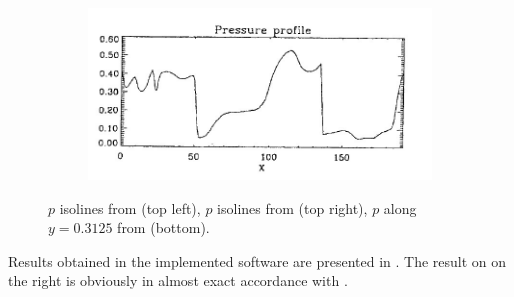 \begin{figure}[H]
\\
\begin{subfigure}[b]{0.75\textwidth}\includegraphics[width=\textwidth]{img/ot/ref-zachary-pressure-profile.jpg}\end{subfigure}
\caption{$p$ isolines from \cite{blast1} (top left), $p$ isolines from \cite{blast0} (top right), $p$ along $y = 0.3125$ from \cite{blast0} (bottom).}
\label{figure:otRef}
\end{figure}

Results obtained in the implemented software are presented in . The result on  on the right is obviously in almost exact accordance with .

